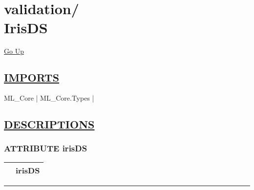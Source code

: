 \chapter*{\color{headfile}
{\large validation\slash\hspace{0pt}}
 \\
IrisDS
}
\hypertarget{ecldoc:toc:validation.IrisDS}{}
\hyperlink{ecldoc:toc:root/validation}{Go Up}

\section*{\underline{\textsf{IMPORTS}}}
\begin{doublespace}
{\large
ML\_Core |
ML\_Core.Types |
}
\end{doublespace}

\section*{\underline{\textsf{DESCRIPTIONS}}}
\subsection*{\textsf{\colorbox{headtoc}{\color{white} ATTRIBUTE}
irisDS}}

\hypertarget{ecldoc:validation.irisds}{}

{\renewcommand{\arraystretch}{1.5}
\begin{tabularx}{\textwidth}{|>{\raggedright\arraybackslash}l|X|}
\hline
\hspace{0pt}\mytexttt{\color{red} } & \textbf{irisDS} \\
\hline
\end{tabularx}
}

\par


\rule{\linewidth}{0.5pt}

